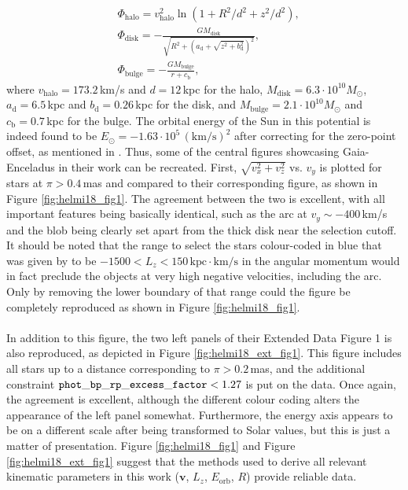 \documentclass[a4paper,11pt]{article}
\begin{document}
%
\begin{align}
 &\Phi_\mathrm{halo}=v^2_\mathrm{halo}\ln{\left(1+R^2/d^2+z^2/d^2\right)},\\
 &\Phi_\mathrm{disk}=-\frac{GM_\mathrm{disk}}{\sqrt{R^2+\left(a_\mathrm{d}+\sqrt{z^2+b^2_\mathrm{d}}\right)^2}},\\
 &\Phi_\mathrm{bulge}=-\frac{GM_\mathrm{bulge}}{r+c_\mathrm{b}},
\end{align}
%
where $v_\mathrm{halo}=173.2$\,km/s and $d=12$\,kpc for the halo, $M_\mathrm{disk}=6.3\cdot10^{10}M_\odot$, $a_\mathrm{d}=6.5$\,kpc and $b_\mathrm{d}=0.26$\,kpc for the disk, and $M_\mathrm{bulge}=2.1\cdot10^{10}M_\odot$ and $c_\mathrm{b}=0.7$\,kpc for the bulge. The orbital energy of the Sun in this potential is indeed found to be $E_\odot = -1.63\cdot10^5\,\mathrm{(km/s)}^2$ after correcting for the zero-point offset, as mentioned in \citet{helmi18}. Thus, some of the central figures showcasing Gaia-Enceladus in their work can be recreated. First, $\sqrt{v_x^2+v_z^2}$ vs. $v_y$ is plotted for stars at $\pi>0.4$\,mas and compared to their corresponding figure, as shown in Figure \ref{fig:helmi18_fig1}. The agreement between the two is excellent, with all important features being basically identical, such as the arc at $v_y\sim-400$\,km/s and the blob being clearly set apart from the thick disk near the selection cutoff. It should be noted that the range to select the stars colour-coded in blue that was given by \citet{helmi18} to be $-1500<L_z<150\,\mathrm{kpc}{\cdot}\mathrm{km/s}$ in the angular momentum would in fact preclude the objects at very high negative velocities, including the arc. Only by removing the lower boundary of that range could the figure be completely reproduced as shown in Figure \ref{fig:helmi18_fig1}.\\ \\
%
In addition to this figure, the two left panels of their Extended Data Figure 1 is also reproduced, as depicted in Figure \ref{fig:helmi18_ext_fig1}. This figure includes all stars up to a distance corresponding to $\pi>0.2$\,mas, and the additional constraint ${\tt phot\_bp\_rp\_excess\_factor}<1.27$ is put on the data. Once again, the agreement is excellent, although the different colour coding alters the appearance of the left panel somewhat. Furthermore, the energy axis appears to be on a different scale after being transformed to Solar values, but this is just a matter of presentation. Figure \ref{fig:helmi18_fig1} and Figure \ref{fig:helmi18_ext_fig1} suggest that the methods used to derive all relevant kinematic parameters in this work ($\bm{v}$, $L_z$, $E_\mathrm{orb}$, $R$) provide reliable data.
\end{document}
